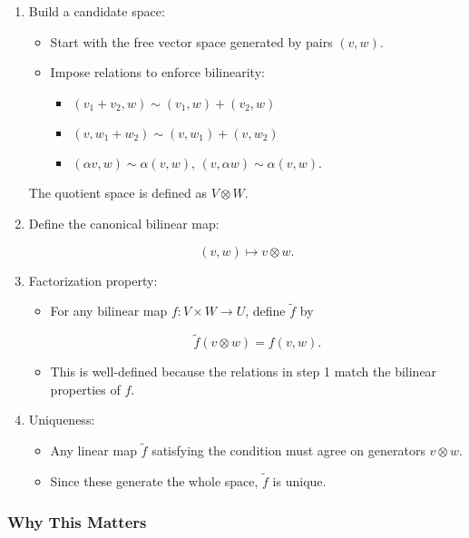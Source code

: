 \documentclass[
  letterpaper,
  DIV=11,
  numbers=noendperiod]{scrreprt}
\providecommand{\tightlist}{%
  \setlength{\itemsep}{0pt}\setlength{\parskip}{0pt}}
\begin{document}
\begin{enumerate}
\def\labelenumi{\arabic{enumi}.}
\item
  Build a candidate space:

  \begin{itemize}
  \item
    Start with the free vector space generated by pairs \((v,w)\).
  \item
    Impose relations to enforce bilinearity:

    \begin{itemize}
    \tightlist
    \item
      \((v_1+v_2, w) \sim (v_1, w) + (v_2, w)\)
    \item
      \((v, w_1+w_2) \sim (v, w_1) + (v, w_2)\)
    \item
      \((\alpha v, w) \sim \alpha (v,w)\),
      \((v, \alpha w) \sim \alpha (v,w)\).
    \end{itemize}
  \end{itemize}

  The quotient space is defined as \(V \otimes W\).
\item
  Define the canonical bilinear map:

  \[
  (v,w) \mapsto v \otimes w.
  \]
\item
  Factorization property:

  \begin{itemize}
  \item
    For any bilinear map \(f: V \times W \to U\), define \(\tilde{f}\)
    by

    \[
    \tilde{f}(v \otimes w) = f(v,w).
    \]
  \item
    This is well-defined because the relations in step 1 match the
    bilinear properties of \(f\).
  \end{itemize}
\item
  Uniqueness:

  \begin{itemize}
  \tightlist
  \item
    Any linear map \(\tilde{f}\) satisfying the condition must agree on
    generators \(v \otimes w\).
  \item
    Since these generate the whole space, \(\tilde{f}\) is unique.
  \end{itemize}
\end{enumerate}

\subsubsection{Why This Matters}\label{why-this-matters-60}
\end{document}
